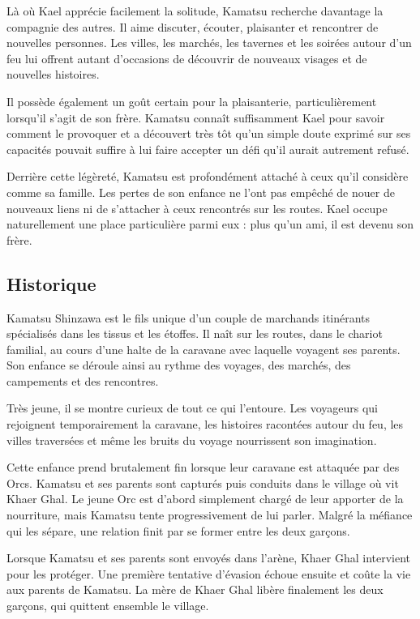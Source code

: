 Là où Kael apprécie facilement la solitude, Kamatsu recherche davantage la
compagnie des autres. Il aime discuter, écouter, plaisanter et rencontrer de
nouvelles personnes. Les villes, les marchés, les tavernes et les soirées
autour d'un feu lui offrent autant d'occasions de découvrir de nouveaux
visages et de nouvelles histoires.

Il possède également un goût certain pour la plaisanterie, particulièrement
lorsqu'il s'agit de son frère. Kamatsu connaît suffisamment Kael pour savoir
comment le provoquer et a découvert très tôt qu'un simple doute exprimé sur
ses capacités pouvait suffire à lui faire accepter un défi qu'il aurait
autrement refusé.

Derrière cette légèreté, Kamatsu est profondément attaché à ceux qu'il
considère comme sa famille. Les pertes de son enfance ne l'ont pas empêché de
nouer de nouveaux liens ni de s'attacher à ceux rencontrés sur les routes.
Kael occupe naturellement une place particulière parmi eux : plus qu'un ami,
il est devenu son frère.

\subsection*{Historique}

Kamatsu Shinzawa est le fils unique d'un couple de marchands itinérants
spécialisés dans les tissus et les étoffes. Il naît sur les routes, dans le
chariot familial, au cours d'une halte de la caravane avec laquelle voyagent
ses parents. Son enfance se déroule ainsi au rythme des voyages, des marchés,
des campements et des rencontres.

Très jeune, il se montre curieux de tout ce qui l'entoure. Les voyageurs qui
rejoignent temporairement la caravane, les histoires racontées autour du feu,
les villes traversées et même les bruits du voyage nourrissent son
imagination.

Cette enfance prend brutalement fin lorsque leur caravane est attaquée par des
Orcs. Kamatsu et ses parents sont capturés puis conduits dans le village où
vit Khaer Ghal. Le jeune Orc est d'abord simplement chargé de leur apporter de
la nourriture, mais Kamatsu tente progressivement de lui parler. Malgré la
méfiance qui les sépare, une relation finit par se former entre les deux
garçons.

Lorsque Kamatsu et ses parents sont envoyés dans l'arène, Khaer Ghal
intervient pour les protéger. Une première tentative d'évasion échoue ensuite
et coûte la vie aux parents de Kamatsu. La mère de Khaer Ghal libère
finalement les deux garçons, qui quittent ensemble le village.

